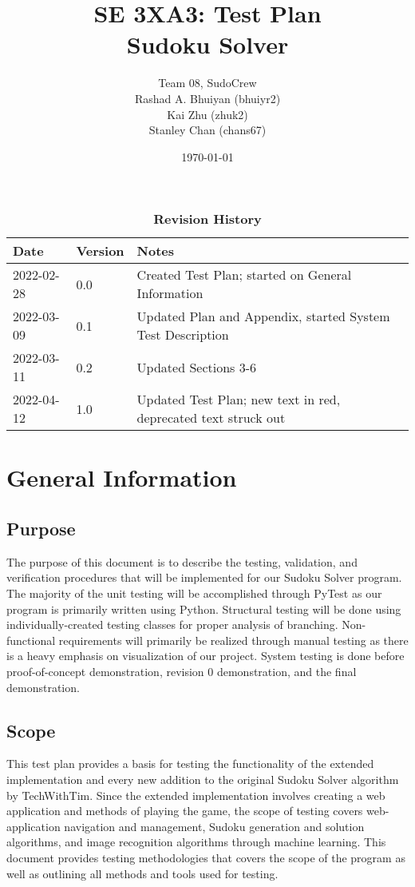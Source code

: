 \documentclass[11pt]{article}
\title{SE 3XA3: Test Plan\\Sudoku Solver}
\author{Team 08, SudoCrew
		\\ Rashad A. Bhuiyan (bhuiyr2)
		\\ Kai Zhu (zhuk2)
		\\ Stanley Chan (chans67)
}
\date{\today}
\begin{document}
\maketitle

\tableofcontents
\listoftables
\listoffigures

\newpage

\begin{table}[H]
\caption{\bf Revision History}
\begin{tabularx}{\textwidth}{p{3cm}p{2cm}X}
\toprule {\bf Date} & {\bf Version} & {\bf Notes}\\
\midrule
2022-02-28 & 0.0 & Created Test Plan; started on General Information\\
2022-03-09 & 0.1 & Updated Plan and Appendix, started System Test Description\\
2022-03-11 & 0.2 & Updated Sections 3-6\\
2022-04-12 & 1.0 & Updated Test Plan; new text in red, deprecated text struck out\\
\bottomrule
\end{tabularx}
\end{table}

\newpage


\section{General Information}

\subsection{Purpose}
The purpose of this document is to describe the testing, validation, and verification procedures that will be implemented for our Sudoku Solver program. The majority of the unit testing will be accomplished through PyTest as our program is primarily written using Python. Structural testing will be done using individually-created testing classes for proper analysis of branching. Non-functional requirements will primarily be realized through manual testing as there is a heavy emphasis on visualization of our project. System testing is done before proof-of-concept demonstration, revision 0 demonstration, and the final demonstration.

\subsection{Scope}
This test plan provides a basis for testing the functionality of the extended implementation and every new addition to the original Sudoku Solver algorithm by TechWithTim. Since the extended implementation involves creating a web application and methods of playing the game, the scope of testing covers web-application navigation and management, Sudoku generation and solution algorithms, and image recognition algorithms through machine learning. This document provides testing methodologies that covers the scope of the program as well as outlining all methods and tools used for testing.
\end{document}
